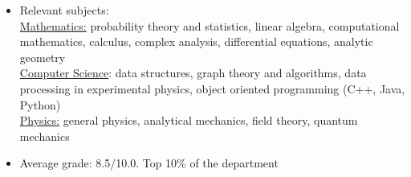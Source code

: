 \documentclass[10pt,a4paper,ragged2e]{altacv}
\begin{document}
\tagline{}

\begin{fullwidth}
\makecvheader
\end{fullwidth}




\begin{itemize}
	\item Relevant subjects: \\
	\underline{Mathematics:} probability theory and statistics, linear algebra, computational mathematics, calculus, complex analysis, differential equations, analytic geometry\\
	\underline{Computer Science}: data structures, graph theory and algorithms, data processing in experimental physics, object oriented programming (C++, Java, Python)\\
	\underline{Physics:} general physics, analytical mechanics, field theory, quantum mechanics\\
	\item Average grade: 8.5/10.0. Top 10\% of the department
\end{itemize}
\end{document}
